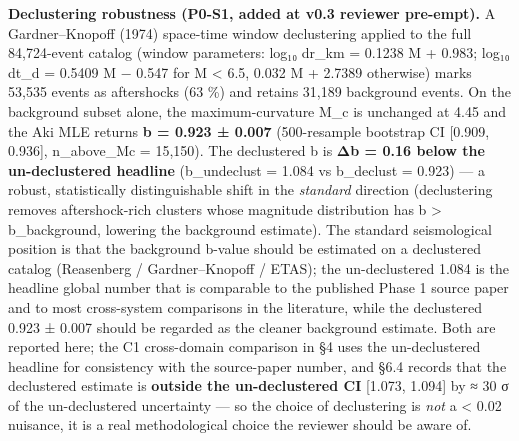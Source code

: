 \documentclass[
  11pt]{article}
\begin{document}
\textbf{Declustering robustness (P0-S1, added at v0.3 reviewer
pre-empt).} A Gardner--Knopoff (1974) space-time window declustering
applied to the full 84,724-event catalog (window parameters: log₁₀
dr\_km = 0.1238 M + 0.983; log₁₀ dt\_d = 0.5409 M − 0.547 for M
\textless{} 6.5, 0.032 M + 2.7389 otherwise) marks 53,535 events as
aftershocks (63 \%) and retains 31,189 background events. On the
background subset alone, the maximum-curvature M\_c is unchanged at 4.45
and the Aki MLE returns \textbf{b = 0.923 ± 0.007} (500-resample
bootstrap CI {[}0.909, 0.936{]}, n\_above\_Mc = 15,150). The declustered
b is \textbf{Δb = 0.16 below the un-declustered headline} (b\_undeclust
= 1.084 vs b\_declust = 0.923) --- a robust, statistically
distinguishable shift in the \emph{standard} direction (declustering
removes aftershock-rich clusters whose magnitude distribution has b
\textgreater{} b\_background, lowering the background estimate). The
standard seismological position is that the background b-value should be
estimated on a declustered catalog (Reasenberg / Gardner--Knopoff /
ETAS); the un-declustered 1.084 is the headline global number that is
comparable to the published Phase 1 source paper and to most
cross-system comparisons in the literature, while the declustered 0.923
± 0.007 should be regarded as the cleaner background estimate. Both are
reported here; the C1 cross-domain comparison in §4 uses the
un-declustered headline for consistency with the source-paper number,
and §6.4 records that the declustered estimate is \textbf{outside the
un-declustered CI} {[}1.073, 1.094{]} by ≈ 30 σ of the un-declustered
uncertainty --- so the choice of declustering is \emph{not} a
\textless{} 0.02 nuisance, it is a real methodological choice the
reviewer should be aware of.
\end{document}
